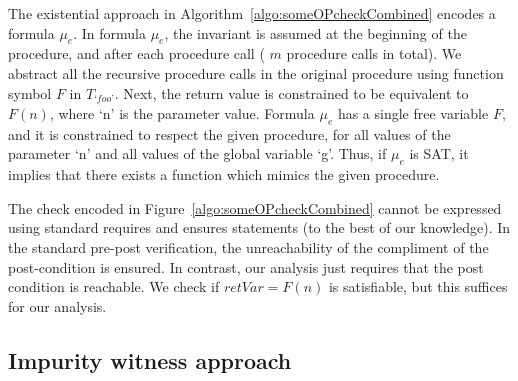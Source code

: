 \documentclass{llncs}
\newcommand{\foo}{\textit{`foo'}}
\newcommand{\pathCondition}{\mathit{T_{\foo}}}
\newcommand{\retVar}{\textit{retVar}}
\newcommand{\F}{\mathit{F}}
\newcommand{\formula}{\mu}
\begin{document}
The existential approach in Algorithm~\ref{algo:someOPcheckCombined}
encodes a formula $\formula_e$. In formula $\formula_e$, the invariant
is assumed at the beginning of the procedure, and after each procedure
call ( $m$ procedure calls in total).  We abstract all the recursive
procedure calls in the original procedure using function symbol $\F$
in $\pathCondition$.  Next, the return value is constrained to be
equivalent to $\F(n)$, where `n' is the parameter value. Formula
$\formula_e$ has a single free variable $\F$, and it is constrained to
respect the given procedure, for all values of the parameter `n' and
all values of the global variable `g'. Thus, if $\formula_e$ is SAT,
it implies that there exists a function which mimics the given
procedure. 

The check encoded in Figure~\ref{algo:someOPcheckCombined} cannot be
expressed using standard requires and ensures statements (to the best
of our knowledge). In the standard pre-post verification, the
unreachability of the compliment of the post-condition is ensured. In
contrast, our analysis just requires that the post condition is
reachable. We check if $\retVar = \F(n)$ is satisfiable, but this
suffices for our analysis.

\subsection{Impurity witness approach}\label{sec:impurityWitness}
\end{document}
